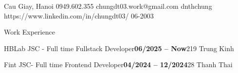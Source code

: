 \documentclass[]{style}
\newcommand{\bolddate}[1]{\textbf{#1}}
\begin{document}
\resumeheader
{Cau Giay, Hanoi} %
{0949.602.355}
{chungdt03.work@gmail.com}
{dnthchung}
{}
{https://www.linkedin.com/in/chungdt03/} %
{} %
{06-2003}

\begin{section}{Work Experience}
 \begin{subsectionnobulletnolist}
  {HBLab JSC - Full time}
  {Fullstack Developer}{\bolddate{06/2025 -- Now}}{219 Trung Kinh}
 \end{subsectionnobulletnolist}

  \begin{subsectionnobulletnolist}
  {Fint JSC- Full time}
  {Frontend Developer}{\bolddate{04/2024 -- 12/2024}}{28 Thanh Thai}
  \end{subsectionnobulletnolist}

\end{section}



\end{document}
